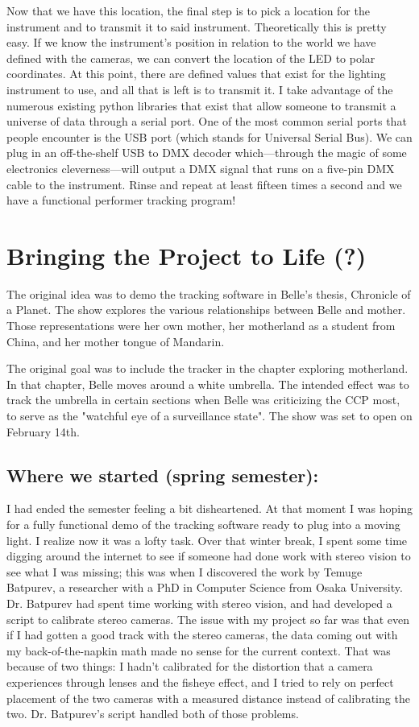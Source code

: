 \documentclass[
    12pt,
    twoside,
    bibstyle=chicago,
    headerstyle=uppercase,
	bibfile=thesis_updating.bib
]{reedthesis}
\begin{document}
Now that we have this location, the final step is to pick a location for the instrument and to transmit it to said instrument. Theoretically this is pretty easy. If we know the instrument's position in relation to the world we have defined with the cameras, we can convert the location of the LED to polar coordinates. At this point, there are defined values that exist for the lighting instrument to use, and all that is left is to transmit it. I take advantage of the numerous existing python libraries that exist that allow someone to transmit a universe of data through a serial port. One of the most common serial ports that people encounter is the USB port (which stands for Universal Serial Bus). We can plug in an off-the-shelf USB to DMX decoder which---through the magic of some electronics cleverness---will output a DMX signal that runs on a five-pin DMX cable to the instrument. Rinse and repeat at least fifteen times a second and we have a functional performer tracking program!

\chapter{Bringing the Project to Life (?)}
The original idea was to demo the tracking software in Belle's thesis, Chronicle of a Planet. The show explores the various relationships between Belle and mother. Those representations were her own mother, her motherland as a student from China, and her mother tongue of Mandarin.

The original goal was to include the tracker in the chapter exploring motherland. In that chapter, Belle moves around a white umbrella. The intended effect was to track the umbrella in certain sections when Belle was criticizing the CCP most, to serve as the "watchful eye of a surveillance state". The show was set to open on February 14th.

\section{Where we started (spring semester):}

I had ended the semester feeling a bit disheartened. At that moment I was hoping for a fully functional demo of the tracking software ready to plug into a moving light. I realize now it was a lofty task. Over that winter break, I spent some time digging around the internet to see if someone had done work with stereo vision to see what I was missing; this was when I discovered the work by Temuge Batpurev, a researcher with a PhD in Computer Science from Osaka University. Dr. Batpurev had spent time working with stereo vision, and had developed a script to calibrate stereo cameras. The issue with my project so far was that even if I had gotten a good track with the stereo cameras, the data coming out with my back-of-the-napkin math made no sense for the current context. That was because of two things: I hadn't calibrated for the distortion that a camera experiences through lenses and the fisheye effect, and I tried to rely on perfect placement of the two cameras with a measured distance instead of calibrating the two. Dr. Batpurev's script handled both of those problems.
\end{document}
